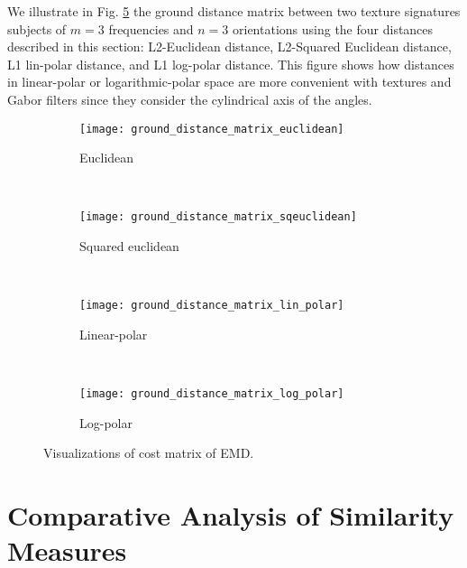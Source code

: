 We illustrate in Fig. \ref{fig:EMD_ground_distance_matrix} the ground distance matrix between two texture signatures subjects of $m = 3$ frequencies and $n = 3$ orientations using the four distances described in this section: L2-Euclidean distance, L2-Squared Euclidean distance, L1 lin-polar distance, and L1 log-polar distance. This figure shows how distances in linear-polar or logarithmic-polar space are more convenient with textures and Gabor filters since they consider the cylindrical axis of the angles.

\begin{figure}[!ht]
    \centering
    \begin{subfigure}[b]{0.47\textwidth}
		\texttt{[image: ground\_distance\_matrix\_euclidean]}	
		\caption{Euclidean}
        \label{fig:ground_distance_matrix_euclidean}
	\end{subfigure}
	~ %
    \begin{subfigure}[b]{0.47\textwidth}
		\texttt{[image: ground\_distance\_matrix\_sqeuclidean]}	
		\caption{Squared euclidean}
        \label{fig:ground_distance_matrix_sqeuclidean}
	\end{subfigure} \\[2ex]
    
    \begin{subfigure}[b]{0.47\textwidth}
		\texttt{[image: ground\_distance\_matrix\_lin\_polar]}	
		\caption{Linear-polar}
        \label{fig:ground_distance_matrix_lin_polar}
	\end{subfigure}  
	~ %
	\begin{subfigure}[b]{0.47\textwidth}
		\texttt{[image: ground\_distance\_matrix\_log\_polar]}	
		\caption{Log-polar}
        \label{fig:ground_distance_matrix_log_polar}
	\end{subfigure}  
	   
   \caption{Visualizations of cost matrix of EMD.}
   \label{fig:EMD_ground_distance_matrix}
\end{figure}


\section{Comparative Analysis of Similarity Measures}\label{sec:comparison}


